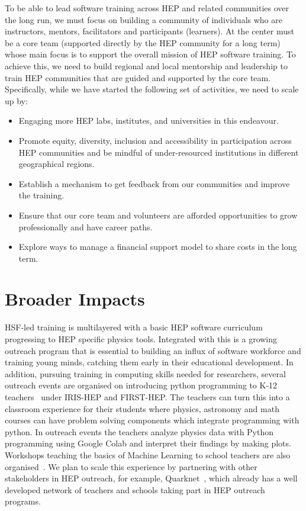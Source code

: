 \documentclass[twocolumn]{svjour3}          %
\begin{document}
To be able to lead software training across HEP and related communities over the long run, we must focus on building a community of individuals who are instructors, mentors, facilitators and participants (learners).  At the center must be a core team (supported directly by the HEP community for a long term) whose main focus is to support the overall mission of HEP software training. To achieve this, we need to build regional and local mentorship and leadership to train HEP communities that are guided and supported by the core team. Specifically, while we have started the following set of activities, we need to scale up by:

\begin{itemize} 
 
\item Engaging more HEP labs, institutes, and universities in this endeavour. 
\item Promote equity, diversity, inclusion and accessibility in participation across HEP communities and  be mindful of under-resourced institutions in different geographical regions.
\item Establish a mechanism to get feedback from our communities and improve the training.
\item Ensure that our core team and volunteers are afforded opportunities to grow professionally and have career paths.
\item Explore ways to manage a financial support model to share costs in the long term.

\end{itemize}

\section{Broader Impacts}\label{sec:BroaderImpacts}

HSF-led training is multilayered with a basic HEP software curriculum progressing to HEP specific physics tools. Integrated with this is a growing outreach program that is essential to building an influx of software workforce and training young minds, catching them early in their educational development. In addition, pursuing training in computing skills needed for researchers, several outreach events are organised on introducing python programming to K-12 teachers~\cite{HSF-training-DA-STEM-PR-2020} under IRIS-HEP and FIRST-HEP. The teachers can turn this into a classroom experience for their students where physics, astronomy and math courses can have problem solving components which integrate programming with python. In outreach events the teachers analyze physics data with Python programming using Google Colab and interpret their findings by making plots. Workshops teaching the basics of Machine Learning to school teachers are also organised~\cite{HSF-training-ML-STEM-PR-2021}. We plan to scale this experience by partnering with other stakeholders in HEP outreach, for example, Quarknet~\cite{quarknet}, which already has a well developed network of teachers and schools taking part in HEP outreach programs.
\end{document}
